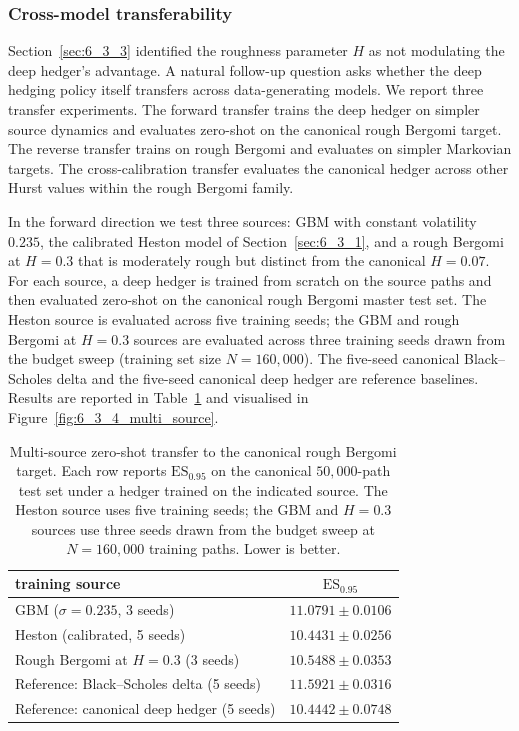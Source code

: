 \documentclass[12pt,a4paper]{article}
\theoremstyle{definition}
\theoremstyle{plain}
\theoremstyle{remark}
\theoremstyle{plain}
\begin{document}
\subsubsection{Cross-model transferability}
\label{sec:6_3_4}

Section~\ref{sec:6_3_3} identified the roughness parameter $H$ as not
modulating the deep hedger's advantage. A natural follow-up question
asks whether the deep hedging policy itself transfers across data-generating
models. We report three transfer experiments. The forward transfer
trains the deep hedger on simpler source dynamics and evaluates
zero-shot on the canonical rough Bergomi target. The reverse transfer
trains on rough Bergomi and evaluates on simpler Markovian targets. The
cross-calibration transfer evaluates the canonical hedger across other
Hurst values within the rough Bergomi family.

In the forward direction we test three sources: GBM with constant
volatility $0.235$, the calibrated Heston model of Section~\ref{sec:6_3_1},
and a rough Bergomi at $H = 0.3$ that is moderately rough but distinct
from the canonical $H = 0.07$. For each source, a deep hedger is
trained from scratch on the source paths and then evaluated zero-shot
on the canonical rough Bergomi master test set. The Heston source is
evaluated across five training seeds; the GBM and rough Bergomi at
$H = 0.3$ sources are evaluated across three training seeds drawn from
the budget sweep (training set size $N = 160{,}000$). The five-seed
canonical Black--Scholes delta and the five-seed canonical deep hedger
are reference baselines. Results are reported in
Table~\ref{tab:6_3_4_multi_source} and visualised in
Figure~\ref{fig:6_3_4_multi_source}.

\begin{table}[H]
\centering
\caption{Multi-source zero-shot transfer to the canonical rough
Bergomi target. Each row reports $\mathrm{ES}_{0.95}$ on the canonical
$50{,}000$-path test set under a hedger trained on the indicated
source. The Heston source uses five training seeds; the GBM and
$H = 0.3$ sources use three seeds drawn from the budget sweep at
$N = 160{,}000$ training paths. Lower is better.}
\label{tab:6_3_4_multi_source}
\begin{tabular}{l c}
\toprule
training source & $\mathrm{ES}_{0.95}$ \\
\midrule
GBM ($\sigma = 0.235$, 3 seeds)                          & $11.0791 \pm 0.0106$ \\
Heston (calibrated, 5 seeds)                             & $10.4431 \pm 0.0256$ \\
Rough Bergomi at $H = 0.3$ (3 seeds)                     & $10.5488 \pm 0.0353$ \\
\midrule
Reference: Black--Scholes delta (5 seeds)                & $11.5921 \pm 0.0316$ \\
Reference: canonical deep hedger (5 seeds)               & $10.4442 \pm 0.0748$ \\
\bottomrule
\end{tabular}
\end{table}
\end{document}
